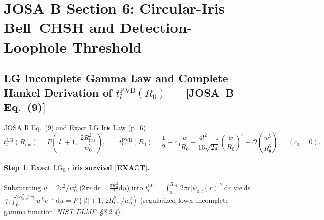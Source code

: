 \documentclass[10pt,letterpaper]{article}
\newcommand{\abs}[1]{\lvert #1 \rvert}
\newcommand{\dd}{\mathrm{d}}
\newcommand{\josb}[1]{\textbf{[JOSA~B Eq.~(#1)]}}
\newcommand{\tagexact}{\textcolor{forest}{\textbf{[EXACT]}}}
\numberwithin{equation}{section}
\begin{document}
\section{JOSA B Section 6: Circular-Iris Bell--CHSH and Detection-Loophole Threshold}
\label{sec:v2_b6}

\subsection{LG Incomplete Gamma Law and Complete Hankel Derivation of $t_l^{\mathrm{PVB}}(R_0)$ --- \josb{9}}

\begin{targeteq}{JOSA B Eq.~(9) and Exact LG Iris Law (p.~6)}
\[
  t_l^{\mathrm{LG}}(R_{\mathrm{iris}}) = P\!\left(\abs{l}+1,\;\frac{2R_{\mathrm{iris}}^2}{w_0^2}\right), \qquad
  t_l^{\mathrm{PVB}}(R_0) = \frac{1}{2} + c_0\frac{w}{R_0} - \frac{4l^2-1}{16\sqrt{2\pi}}\left(\frac{w}{R_0}\right)^3 + \mathcal{O}\!\left(\frac{w^5}{R_0^5}\right), \quad (c_0 = 0).
\]
\end{targeteq}

\paragraph*{Step 1: Exact $\mathrm{LG}_{0,l}$ iris survival \tagexact{}.}
Substituting $u = 2r^2/w_0^2$ ($2\pi r\,\dd r = \frac{\pi w_0^2}{2}\dd u$) into $t_l^{\mathrm{LG}} = \int_0^{R_{\mathrm{iris}}} 2\pi r\abs{\psi_{0,l}(r)}^2\,\dd r$ yields $\frac{1}{\abs{l}!}\int_0^{2R_{\mathrm{iris}}^2/w_0^2} u^{\abs{l}} e^{-u}\,\dd u = P(\abs{l}+1,\,2R_{\mathrm{iris}}^2/w_0^2)$ (regularized lower incomplete gamma function, \emph{NIST DLMF~\S8.2.4}).
\end{document}
